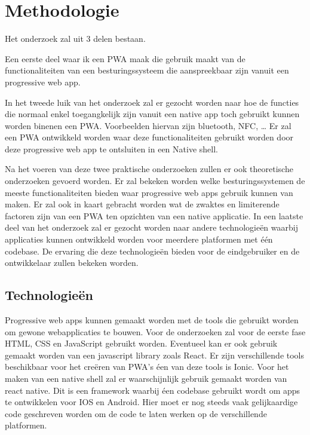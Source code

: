 

\section{Methodologie}
\label{sec:methodologie}
Het onderzoek zal uit 3 delen bestaan. 

Een eerste deel waar ik een PWA maak die gebruik maakt van de functionaliteiten van een besturingssysteem die aanspreekbaar zijn vanuit een progressive web app. 

In het tweede luik van het onderzoek zal er gezocht worden naar hoe de functies die normaal enkel toegangkelijk zijn vanuit een native app toch gebruikt kunnen worden binenen een PWA. Voorbeelden hiervan zijn bluetooth, NFC, … 
Er zal een PWA ontwikkeld worden waar deze functionaliteiten gebruikt worden door deze progressive web app te ontsluiten in een Native shell.

Na het voeren van deze twee praktische onderzoeken zullen er ook theoretische onderzoeken gevoerd worden. 
Er zal bekeken worden welke besturingssystemen de meeste functionaliteiten bieden waar progressive web apps gebruik kunnen van maken. 
Er zal ook in kaart gebracht worden wat de zwaktes en limiterende factoren zijn van een PWA ten opzichten van een native applicatie.
In een laatste deel van het onderzoek zal er gezocht worden naar andere technologieën waarbij applicaties kunnen ontwikkeld worden voor meerdere platformen met één codebase. De ervaring die deze technologieën bieden voor de eindgebruiker en de ontwikkelaar zullen bekeken worden.



\subsection{Technologieën}

Progressive web apps kunnen gemaakt worden met de tools die gebruikt worden om gewone webapplicaties te bouwen. 
Voor de onderzoeken zal voor de eerste fase HTML, CSS en JavaScript gebruikt worden. Eventueel kan er ook gebruik gemaakt worden van een javascript library zoals React.
Er zijn verschillende tools beschikbaar voor het creëren van PWA’s éen van deze tools is Ionic.
Voor het maken van een native shell zal er waarschijnlijk gebruik gemaakt worden van react native. Dit is een framework waarbij éen codebase gebruikt wordt om apps te ontwikkelen voor IOS en Android. Hier moet er nog steeds vaak gelijkaardige code geschreven worden om de code te laten werken op de verschillende platformen.




